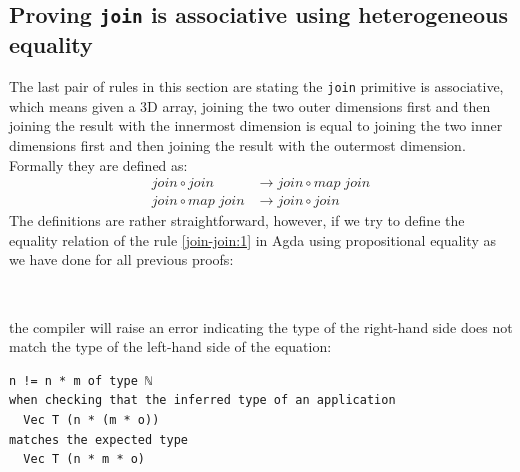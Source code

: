 \documentclass{l4proj}
\begin{document}
\subsection{Proving \texttt{join} is associative using heterogeneous equality}
\label{move:heter}
The last pair of rules in this section are stating the \texttt{join} primitive is associative, which means given a 3D array, joining the two outer dimensions first and then joining the result with the innermost dimension is equal to joining the two inner dimensions first and then joining the result with the outermost dimension. Formally they are defined as:
\begin{align}
    \label{join-join:1}
    join \circ join &\to join \circ map\; join\\
    \label{join-join:2}
    join \circ map\; join &\to join \circ join
\end{align}
The definitions are rather straightforward, however, if we try to define the equality relation of the rule \ref{join-join:1} in Agda using propositional equality as we have done for all previous proofs:
\begin{code}%
\>[0]\AgdaSpace{}%
\AgdaSymbol{:}%
\>[343I]\AgdaSymbol{\{}\AgdaSpace{}%
\AgdaSpace{}%
\AgdaSpace{}%
\AgdaSymbol{:}\AgdaSpace{}%
\AgdaSymbol{\}}\AgdaSpace{}%
\AgdaSpace{}%
\AgdaSymbol{\{}\AgdaSpace{}%
\AgdaSymbol{:}\AgdaSpace{}%
\AgdaSymbol{\}}\AgdaSpace{}%
\AgdaSpace{}%
\AgdaSymbol{(}\AgdaSpace{}%
\AgdaSymbol{:}\AgdaSpace{}%
\AgdaSpace{}%
\AgdaSymbol{(}\AgdaSpace{}%
\AgdaSymbol{(}\AgdaSpace{}%
\AgdaSpace{}%
\AgdaSymbol{)}\AgdaSpace{}%
\AgdaSymbol{)}\AgdaSpace{}%
\AgdaSymbol{)}\AgdaSpace{}%
\<%
\\
\>[.][@{}l@{}]\<[343I]%
\>[17]\AgdaSpace{}%
\AgdaSymbol{(}\AgdaSpace{}%
\AgdaSymbol{)}\AgdaSpace{}%
\AgdaSpace{}%
\AgdaSpace{}%
\AgdaSymbol{(}\AgdaSpace{}%
\AgdaSpace{}%
\AgdaSymbol{)}\<%
\end{code}
the compiler will raise an error indicating the type of the right-hand side does not match the type of the left-hand side of the equation:
\begin{lstlisting}
n != n * m of type ℕ
when checking that the inferred type of an application
  Vec T (n * (m * o))
matches the expected type
  Vec T (n * m * o)
\end{lstlisting}
\end{document}
